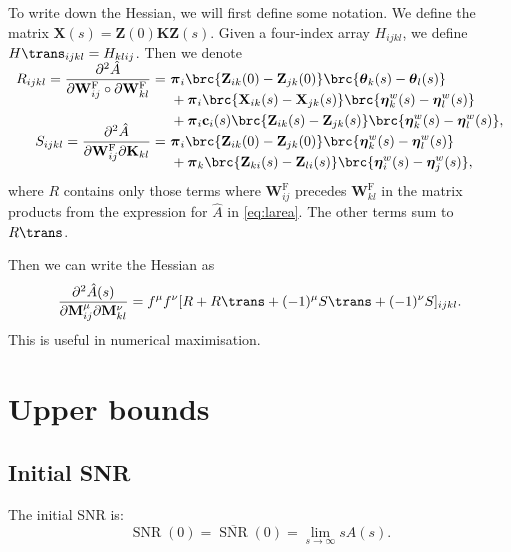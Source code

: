 \documentclass[12pt]{article}
\newcommand{\eq}{\pib}
\newcommand{\fund}{\mathbf{Z}}
\newcommand{\pib}{\boldsymbol{\pi}}
\newcommand{\etw}{\boldsymbol{\eta}^w}
\newcommand{\thb}{\boldsymbol{\theta}}
\newcommand{\W}{\mathbf{W}}
\newcommand{\M}{\mathbf{M}}
\newcommand{\enc}{\mathbf{K}}
\newcommand{\frg}{\W^{\mathrm{F}}}
\DeclareMathOperator{\snr}{SNR}
\newcommand{\snrb}{\overline{\snr}}
\renewcommand{\pdiff}[2]{\frac{\partial #1}{\partial #2}}
\begin{document}
To write down the Hessian, we will first define some notation.
We define the matrix $\mathbf{X}(s) = \fund(0) \enc \fund(s)$.
Given a four-index array $H_{ijkl}$, we define $H\trans_{ijkl} = H_{klij}$.
Then we denote
%
\begin{equation}\label{eq:hessparts}
\begin{alignedat}{3}
    R_{ijkl} = \smash{\pdiff{^2 \hat{A}}{\frg_{ij} \circ \partial \frg_{kl}}} 
    &= \
    &&\eq_i \brc{\fund_{ik}(0) - \fund_{jk}(0)} \brc{\thb_k(s) - \thb_l(s)} \\
    &&&+ \eq_i \brc{\mathbf{X}_{ik}(s) - \mathbf{X}_{jk}(s)} 
          \brc{\etw_k(s) - \etw_l(s)} \\
    &&&+ \eq_i \mathbf{c}_i(s) \brc{\fund_{ik}(s) - \fund_{jk}(s)} 
          \brc{\etw_k(s) - \etw_l(s)},  \\
  S_{ijkl} = \smash{\pdiff{^2 \hat{A}}{\frg_{ij} \partial \enc_{kl}} }
  &= \
    &&\eq_i \brc{\fund_{ik}(0) - \fund_{jk}(0)} \brc{\etw_k(s) - \etw_l(s)} \\
    &&&+ \eq_k \brc{\fund_{ki}(s) - \fund_{li}(s)} \brc{\etw_i(s) - \etw_j(s)},
\end{alignedat}
\end{equation}
%
where \(R\) contains only those terms where \( \frg_{ij} \) precedes \( \frg_{kl} \) in the matrix products from the expression for \( \hat{A} \) in \cref{eq:larea}.
The other terms sum to \(R\trans\).

Then we can write the Hessian as
%
\begin{equation}\label{eq:hessian}
  \pdiff{^2\hat{A}(s)}{\M^\mu_{ij} \partial\M^\nu_{kl}} =
     f^\mu f^\nu [R + R\trans + (-1)^\mu S\trans + (-1)^\nu S]_{ijkl}.
\end{equation}
%
This is useful in numerical maximisation.

\section{Upper bounds}\label{sec:upperbnds}



\subsection{Initial SNR}\label{sec:initial}

The initial SNR is:
%
\begin{equation}\label{eq:initdef}
  \snr(0) = \snrb(0) = \lim_{s\to\infty} sA(s).
\end{equation}
%
\end{document}
